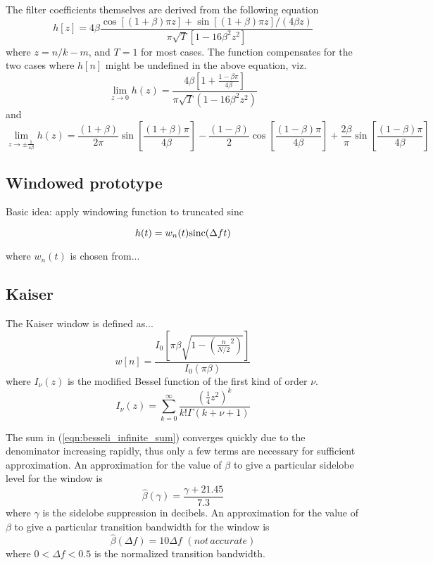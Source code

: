 The filter coefficients themselves are derived from the following equation
\[ 
    h\left[z\right] =
      4\beta \frac{ \cos\left[(1+\beta)\pi z\right] +
                    \sin\left[(1+\beta)\pi z\right] / (4\beta z) }
                  { \pi \sqrt{T}\left[ 1-16\beta^2z^2\right] }
\]
where $z=n/k-m$, and $T=1$ for most cases.
The function compensates for the two cases where $h[n]$ might be
undefined in the above equation, viz.
\[
    \mathop {\lim }\limits_{z \to 0 } h(z) =
      \frac{ 4\beta \left[ 1 + \frac{1-\beta\pi }{ 4\beta } \right] }
           { \pi\sqrt{T}\left( 1-16\beta^2 z^2 \right) }
\]
and
\[
    \mathop {\lim }\limits_{z \to \pm \frac{1}{4\beta} } h(z) =
        \frac{(1+\beta)}{2\pi}\sin\left[\frac{(1+\beta)\pi}{4\beta}\right]
      - \frac{(1-\beta)}{2}\cos\left[\frac{(1-\beta)\pi}{4\beta}\right]
      + \frac{2\beta}{\pi}\sin\left[\frac{(1-\beta)\pi}{4\beta}\right]
\]

\subsection{Windowed prototype}
\label{ch:filterdesign:window}

Basic idea: apply windowing function to truncated sinc

\begin{equation}
h(t) = w_n(t) \textup{sinc}(\Delta f t)
\end{equation}

where $w_n(t)$ is chosen from...

\subsection{Kaiser}
\label{ch:filterdesign:window:kaiser}
The Kaiser window is defined as...
\begin{equation}
\label{eqn:kaiser_window}
w[n] = \frac{I_0\left[\pi\beta\sqrt{1-\left(\frac{n}{N/2}^2\right)}\right]}{I_0\left(\pi\beta\right)}
\end{equation}
where $I_\nu(z)$ is the modified Bessel function of the first kind of order $\nu$.
\begin{equation}
\label{eqn:besseli_infinite_sum}
I_\nu(z) = \sum_{k=0}^{\infty}{\frac{\left(\frac{1}{4}z^2\right)^k}{k!\Gamma(k+\nu+1)}}
\end{equation}

The sum in (\ref{eqn:besseli_infinite_sum}) converges quickly due to the
denominator increasing rapidly, thus only a few terms are necessary for
sufficient approximation.
An approximation for the value of $\beta$ to give a particular sidelobe level
for the window is
\begin{equation}
\hat{\beta}(\gamma) = \frac{\gamma + 21.45}{7.3}
\end{equation}
where $\gamma$ is the sidelobe suppression in decibels.
An approximation for the value of $\beta$ to give a particular transition
bandwidth for the window is
\begin{equation}
\hat{\beta}(\Delta f) = 10\Delta f \,\, (not\, accurate)
\end{equation}
where $0 < \Delta f < 0.5$ is the normalized transition bandwidth.


